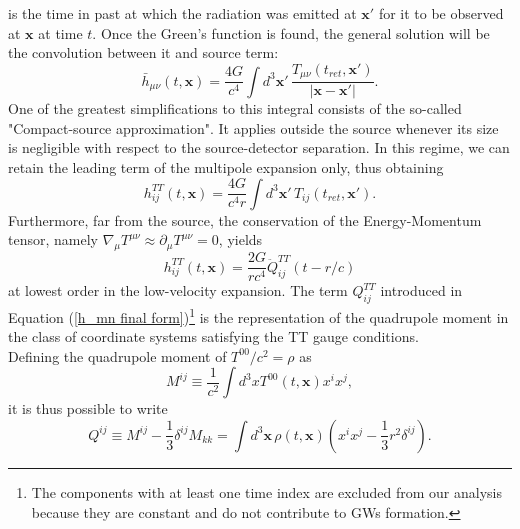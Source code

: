 \documentclass[12pt,twoside,openany]{book}
\begin{document}
is the time in past at which the radiation was emitted at $\mathbf{x'}$ for it to be observed at $\mathbf{x}$ at time $t$. Once the Green's function is found, the general solution will be the convolution between it and source term:
\begin{equation}\label{h_mn general solution}
    \bar{h}_{\mu\nu}(t,\mathbf{x})=\frac{4G}{c^4}\int d^3\mathbf{x'}\,\frac{T_{\mu\nu}(t_{ret},\mathbf{x'})}{|\mathbf{x}-\mathbf{x'}|}.
\end{equation}
One of the greatest simplifications to this integral consists of the so-called "Compact-source approximation". It applies outside the source whenever its size is negligible with respect to the source-detector separation. In this regime, we can retain the leading term of the multipole expansion only, thus obtaining
\begin{equation}\label{h_mn compact source solution}
    h_{ij}^{TT}(t,\mathbf{x})=\frac{4G}{c^4r}\int d^3\mathbf{x'}\,T_{ij}(t_{ret},\mathbf{x'}).
\end{equation}
Furthermore, far from the source, the conservation of the Energy-Momentum tensor, namely $\nabla_\mu T^{\mu\nu}\approx\partial_\mu T^{\mu\nu}=0$, yields
\begin{equation}\label{h_mn final form}
    h_{ij}^{TT}(t,\boldsymbol{x})=\frac{2G}{rc^4}\ddot{Q}^{TT}_{ij}(t-r/c)
\end{equation}
at lowest order in the low-velocity expansion. The term $Q^{TT}_{ij}$ introduced in Equation (\ref{h_mn final form})\footnote{The components with at least one time index are excluded from our analysis because they are constant and do not contribute to GWs formation.} is the representation of the quadrupole moment in the class of coordinate systems satisfying the TT gauge conditions.\\Defining the quadrupole moment of $T^{00}/c^2=\rho$ as
\begin{equation}\label{M_ij definition}
    M^{ij}\equiv \frac{1}{c^2}\int d^3x T^{00}(t,\boldsymbol{x})x^ix^j,
\end{equation}
it is thus possible to write
\begin{equation}\label{Q_ij def}
    Q^{ij}\equiv M^{ij}-\frac{1}{3}\delta^{ij}M_{kk}=\int d^3\mathbf{x}\,\rho(t,\mathbf{x})\left(x^ix^j-\frac{1}{3}r^2\delta^{ij}\right).
\end{equation}
\end{document}
